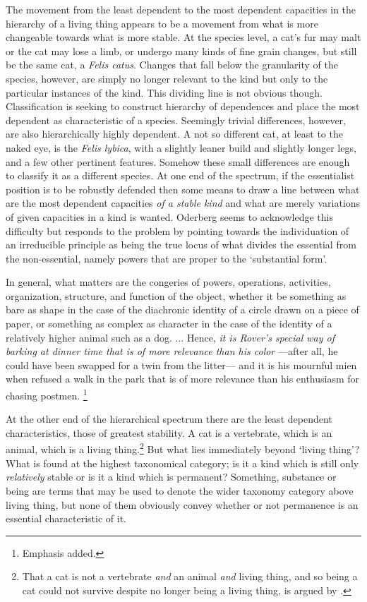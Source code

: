 The movement from the least dependent to the most dependent capacities in the hierarchy of a living thing appears to be a movement from what is more changeable towards what is more stable. At the species level, a cat's fur may malt or the cat may lose a limb, or undergo many kinds of fine grain changes, but still be the same cat, a \emph{Felis catus}. Changes that fall below the granularity of the species, however, are simply no longer relevant to the kind but only to the particular instances of the kind. This dividing line is not obvious though. Classification is seeking to construct hierarchy of dependences and place the most dependent as characteristic of a species. Seemingly trivial differences, however, are also hierarchically highly dependent.  A not so different cat, at least to the naked eye, is the \emph{Felis lybica}, with a slightly leaner build and slightly longer legs, and a few other pertinent features. Somehow these small differences are enough to classify it as a different species. At one end of the spectrum, if the essentialist position is to be robustly defended then some means to draw a line between what are the most dependent capacities \emph{of a stable kind} and what are merely variations of given capacities in a kind is wanted. Oderberg seems to acknowledge this difficulty but responds to the problem by pointing towards the individuation of an irreducible principle as being the true locus of what divides the essential from the non-essential, namely powers that are proper to the `substantial form'.
\begin{quoting}
In general, what matters are the congeries of powers, operations, activities, organization, structure, and function of the object, whether it be something as bare as shape in the case of the diachronic identity of a circle drawn on a piece of paper, or something as complex as character in the case of the identity of a relatively higher animal such as a dog. {...} Hence, \emph{it is Rover's special way of barking at dinner time that is of more relevance than his color} ---after all, he could have been swapped for a twin from the litter--- and it is his mournful mien when refused a walk in the park that is of more relevance than his enthusiasm for chasing postmen.
\parencite[][]{Oderberg2005-ODEHD}\footnote{Emphasis added.}
\end{quoting}

At the other end of the hierarchical spectrum there are the least dependent characteristics, those of greatest stability. A cat is a vertebrate, which is an animal, which is a living thing.\footnote{That a cat is not a vertebrate \emph{and} an animal \emph{and} living thing, and so being a cat could not survive despite no longer being a living thing, is argued by \textcite[][81--83]{Oderberg2005-ODEHD}.}
But what lies immediately beyond `living thing'? What is found at the highest taxonomical category; is it a kind which is still only \emph{relatively} stable or is it a kind which is permanent? Something, substance or being are terms that may be used to denote the wider taxonomy category above living thing, but none of them obviously convey whether or not permanence is an essential characteristic of it.

